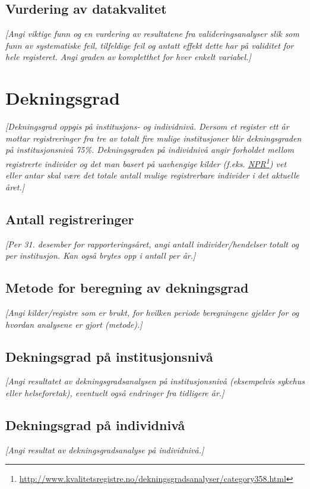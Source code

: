 \documentclass[norsk, a4paper, twocolumn]{report}
\newcommand{\guide}[1] {
	\textit{[\textcolor{guidegray}{#1}]}
	}
\begin{document}
\section{Vurdering av datakvalitet}\label{sec:valdat}
\guide{Angi viktige funn og en vurdering av resultatene fra
valideringsanalyser slik som funn av systematiske feil, tilfeldige feil og
antatt effekt dette har på validitet for hele registeret. Angi graden av
kompletthet for hver enkelt variabel.}



\chapter{Dekningsgrad}\label{cha:dek}
\guide{Dekningsgrad oppgis på institusjons- og individnivå. Dersom
et register ett år mottar registreringer fra tre
av totalt fire mulige institusjoner blir dekningsgraden på
institusjonsnivå 75\%. Dekningsgraden på individnivå angir
forholdet mellom registrerte individer og det man basert på uavhengige
kilder (f.eks.
\href{http://www.kvalitetsregistre.no/dekningsgradsanalyser/category358.html}
{NPR}\footnote{\url{http://www.kvalitetsregistre.no/dekningsgradsanalyser/category358.html}})
vet eller antar skal være det totale antall mulige registrerbare
individer i det aktuelle året.}

\section{Antall registreringer}\label{sec:reg}
\guide{Per 31. desember for rapporteringsåret, angi antall
individer/hendelser totalt og per institusjon. Kan også brytes opp i antall per år.}

\section{Metode for beregning av dekningsgrad}\label{sec:met}
\guide{Angi kilder/registre som er brukt, for hvilken periode beregningene
gjelder for og hvordan analysene er gjort (metode).}

\section{Dekningsgrad på institusjonsnivå}\label{sec:endek}
\guide{Angi resultatet av dekningsgradsanalysen på institusjonsnivå
(eksempelvis sykehus eller helseforetak),
eventuelt også endringer fra tidligere år.}

\section{Dekningsgrad på individnivå}\label{sec:obs}
\guide{Angi resultat av dekningsgradsanalyse på individnivå.}
\end{document}
